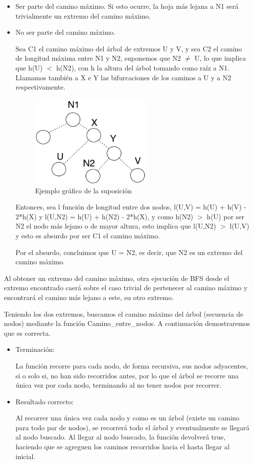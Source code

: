 \documentclass[a4paper, 10pt, twoside]{article}
\begin{document}
\begin{itemize}
  \item Ser parte del camino máximo. Si esto ocurre, la hoja más lejana a N1 será trivialmente un extremo del camino máximo.
  \item No ser parte del camino máximo.
  
  Sea C1 el camino máximo del árbol de extremos U y V, y sea C2 el camino de longitud máxima entre N1 y N2, suponemos que N2 $\neq$ U, lo que implica que h(U) $<$ h(N2), con h la altura del árbol tomando como raíz a N1. Llamamos también a X e Y las bifurcaciones de los caminos a U y a N2 respectivamente.

\begin{figure}[ht!]
\centering
\includegraphics[width=60mm]{2b.png}
\caption{Ejemplo gráfico de la suposición}
\label{overflow}
\end{figure}  
  
  Entonces, sea l función de longitud entre dos nodos, l(U,V) = h(U) + h(V) - 2*h(X) y l(U,N2) = h(U) + h(N2) - 2*h(X), y como h(N2) $>$ h(U) por ser N2 el nodo más lejano o de mayor altura, esto implica que l(U,N2) $>$ l(U,V) y esto es absurdo por ser C1 el camino máximo.
  
  Por el absurdo, concluimos que U = N2, es decir, que N2 es un extremo del camino máximo.
\end{itemize}

Al obtener un extremo del camino máximo, otra ejecución de BFS desde el extremo encontrado caerá sobre el caso trivial de pertenecer al camino máximo y encontrará el camino más lejano a este, su otro extremo.

Teniendo los dos extremos, buscamos el camino máximo del árbol (secuencia de nodos) mediante la función Camino\_entre\_nodos. A continuación demostraremos que es correcta.

\begin{itemize}
\item Terminación:

La función recorre para cada nodo, de forma recursiva, sus nodos adyacentes, si o solo si, no han sido recorridos antes, por lo que el árbol se recorre una única vez por cada nodo, terminando al no tener nodos por recorrer.

\item  Resultado correcto:

Al recorrer una única vez cada nodo y como es un árbol (existe un camino para todo par de nodos), se recorrerá todo el árbol y eventualmente se llegará al nodo buscado. Al llegar al nodo buscado, la función devolverá true, haciendo que se agreguen los caminos recorridos hacia el hasta llegar al inicial.
\end{itemize}
\end{document}
